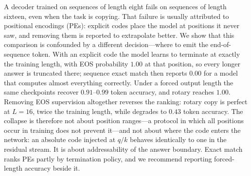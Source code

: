 A decoder trained on sequences of length eight fails on sequences of length
sixteen, even when the task is copying. That failure is usually attributed to
positional encodings (PEs): explicit codes place the model at positions it never
saw, and removing them is reported to extrapolate better. We show that this
comparison is confounded by a different decision---where to emit the
end-of-sequence token. With an explicit code the model learns to terminate at
exactly the training length, with EOS probability $1.00$ at that position, so every
longer answer is truncated there; sequence exact match then reports $0.00$ for a
model that computes almost everything correctly. Under a forced output length the
same checkpoints recover $0.91$--$0.99$ token accuracy, and rotary reaches $1.00$.
Removing EOS supervision altogether reverses the ranking: rotary copy is perfect at
$L{=}16$, twice the training length, while \nope{} degrades to $0.43$ token
accuracy. The collapse is therefore not about position ranges---a protocol in which
all positions occur in training does not prevent it---and not about where the code
enters the network: an absolute code injected at $q/k$ behaves identically to one
in the residual stream. It is about addressability of the answer boundary. Exact
match ranks PEs partly by termination policy, and we recommend reporting
forced-length accuracy beside it.
